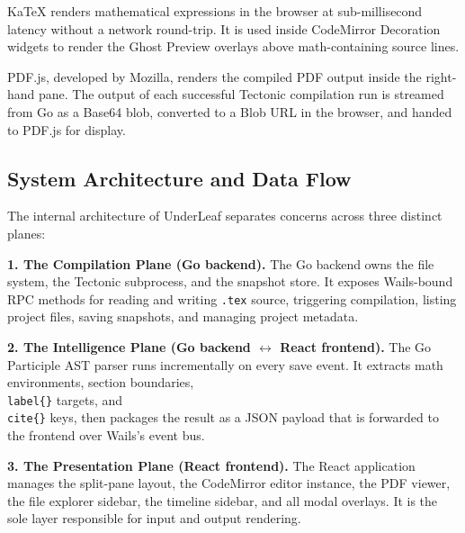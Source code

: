 \documentclass[11pt, a4paper]{article}
\begin{document}
\begin{description}[style=nextline, leftmargin=2cm]
    \item[\texttt{KaTeX} (Inline Math Renderer)]
    KaTeX renders mathematical expressions in the browser at sub-millisecond latency without a network round-trip. It is used inside CodeMirror Decoration widgets to render the Ghost Preview overlays above math-containing source lines.

    \item[\texttt{PDF.js} (PDF Viewer)]
    PDF.js, developed by Mozilla, renders the compiled PDF output inside the right-hand pane. The output of each successful Tectonic compilation run is streamed from Go as a Base64 blob, converted to a Blob URL in the browser, and handed to PDF.js for display.
\end{description}

\subsection{System Architecture and Data Flow}

The internal architecture of UnderLeaf separates concerns across three distinct planes:

\textbf{1. The Compilation Plane (Go backend).} 
The Go backend owns the file system, the Tectonic subprocess, and the snapshot store. It exposes Wails-bound RPC methods for reading and writing \texttt{.tex} source, triggering compilation, listing project files, saving snapshots, and managing project metadata.

\textbf{2. The Intelligence Plane (Go backend $\leftrightarrow$ React frontend).}
The Go Participle AST parser runs incrementally on every save event. It extracts math environments, section boundaries, \texttt{\\label\{\}} targets, and \texttt{\\cite\{\}} keys, then packages the result as a JSON payload that is forwarded to the frontend over Wails's event bus.

\textbf{3. The Presentation Plane (React frontend).}
The React application manages the split-pane layout, the CodeMirror editor instance, the PDF viewer, the file explorer sidebar, the timeline sidebar, and all modal overlays. It is the sole layer responsible for input and output rendering.
\end{document}
